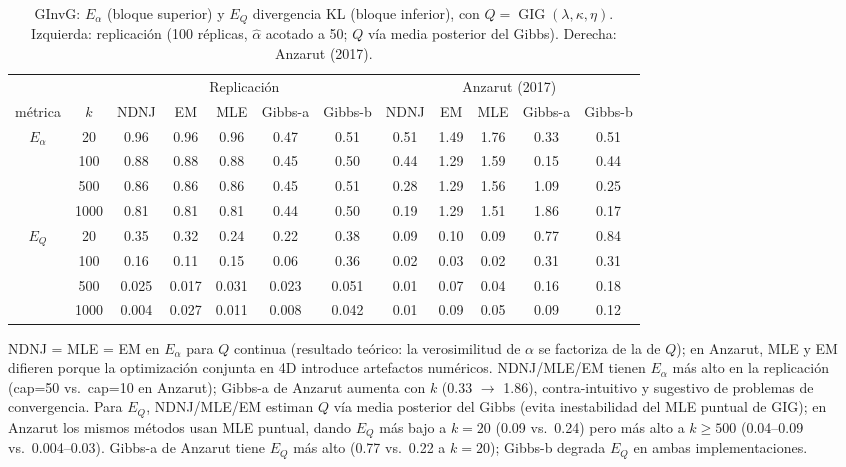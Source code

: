 \documentclass[12pt,letterpaper]{article}
\newcommand{\GIG}{\operatorname{GIG}}
\begin{document}
\begin{table}[h]
\centering
\caption{GInvG: $E_\alpha$ (bloque superior) y $E_Q$ divergencia KL (bloque inferior), con $Q = \GIG(\lambda, \kappa, \eta)$. Izquierda: replicaci\'{o}n (100 r\'{e}plicas, $\hat{\alpha}$ acotado a 50; $Q$ v\'{i}a media posterior del Gibbs). Derecha: Anzarut (2017).}
\label{tab:sim-gig}
\setlength{\tabcolsep}{3pt}
\begin{tabular}{cc|ccccc|ccccc}
\toprule
& & \multicolumn{5}{c|}{Replicaci\'{o}n} & \multicolumn{5}{c}{Anzarut (2017)} \\
\cmidrule(lr){3-7} \cmidrule(lr){8-12}
m\'{e}trica & $k$ & NDNJ & EM & MLE & Gibbs-a & Gibbs-b & NDNJ & EM & MLE & Gibbs-a & Gibbs-b \\
\midrule
\multirow{4}{*}{$E_\alpha$}
& 20   & 0.96 & 0.96 & 0.96 & 0.47 & 0.51 & 0.51 & 1.49 & 1.76 & 0.33 & 0.51 \\
& 100  & 0.88 & 0.88 & 0.88 & 0.45 & 0.50 & 0.44 & 1.29 & 1.59 & 0.15 & 0.44 \\
& 500  & 0.86 & 0.86 & 0.86 & 0.45 & 0.51 & 0.28 & 1.29 & 1.56 & 1.09 & 0.25 \\
& 1000 & 0.81 & 0.81 & 0.81 & 0.44 & 0.50 & 0.19 & 1.29 & 1.51 & 1.86 & 0.17 \\
\midrule
\multirow{4}{*}{$E_Q$}
& 20   & 0.35 & 0.32 & 0.24 & 0.22 & 0.38 & 0.09 & 0.10 & 0.09 & 0.77 & 0.84 \\
& 100  & 0.16 & 0.11 & 0.15 & 0.06 & 0.36 & 0.02 & 0.03 & 0.02 & 0.31 & 0.31 \\
& 500  & 0.025 & 0.017 & 0.031 & 0.023 & 0.051 & 0.01 & 0.07 & 0.04 & 0.16 & 0.18 \\
& 1000 & 0.004 & 0.027 & 0.011 & 0.008 & 0.042 & 0.01 & 0.09 & 0.05 & 0.09 & 0.12 \\
\bottomrule
\end{tabular}
\begin{flushleft}\small
NDNJ = MLE = EM en $E_\alpha$ para $Q$ continua (resultado te\'{o}rico: la verosimilitud de $\alpha$ se factoriza de la de $Q$); en Anzarut, MLE y EM difieren porque la optimizaci\'{o}n conjunta en 4D introduce artefactos num\'{e}ricos. NDNJ/MLE/EM tienen $E_\alpha$ m\'{a}s alto en la replicaci\'{o}n (cap=50 vs.\ cap=10 en Anzarut); Gibbs-a de Anzarut aumenta con $k$ (0.33 $\to$ 1.86), contra-intuitivo y sugestivo de problemas de convergencia. Para $E_Q$, NDNJ/MLE/EM estiman $Q$ v\'{i}a media posterior del Gibbs (evita inestabilidad del MLE puntual de GIG); en Anzarut los mismos m\'{e}todos usan MLE puntual, dando $E_Q$ m\'{a}s bajo a $k=20$ (0.09 vs.\ 0.24) pero m\'{a}s alto a $k\geq 500$ (0.04--0.09 vs.\ 0.004--0.03). Gibbs-a de Anzarut tiene $E_Q$ m\'{a}s alto (0.77 vs.\ 0.22 a $k=20$); Gibbs-b degrada $E_Q$ en ambas implementaciones.
\end{flushleft}
\end{table}
\end{document}

